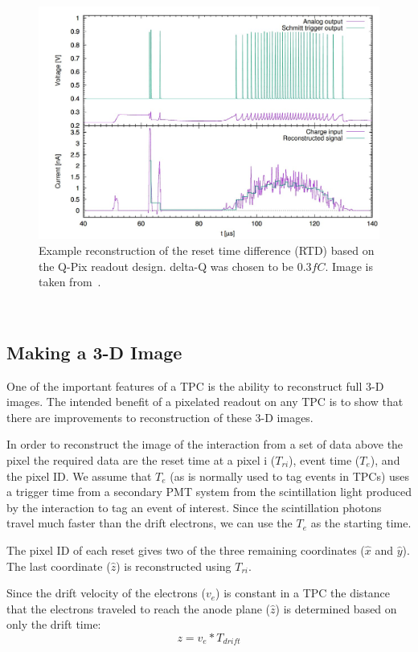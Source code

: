 \begin{figure}[]
\centering
\includegraphics[width=\textwidth]{images/qpix_rtd_reconstruction_example_03fc.jpg}
\caption{Example reconstruction of the reset time difference (RTD) based on the Q-Pix readout design. delta-Q was chosen to be $0.3 fC$. Image is taken from~\citep{qpix:nygren:mei}.}
\end{figure}
~\label{fig:qpixRecon2}

\subsection{Making a 3-D Image}

One of the important features of a TPC is the ability to reconstruct full 3-D images.
The intended benefit of a pixelated readout on any TPC is to show that there are improvements to reconstruction of these 3-D images.

In order to reconstruct the image of the interaction from a set of data above the pixel the required data are the reset time at a pixel i ($T_{ri}$), event time ($T_{e}$), and the pixel ID.
We assume that $T_{e}$ (as is normally used to tag events in TPCs) uses a trigger time from a secondary PMT system from the scintillation light produced by the interaction to tag an event of interest.
Since the scintillation photons travel much faster than the drift electrons, we can use the $T_{e}$ as the starting time.

The pixel ID of each reset gives two of the three remaining coordinates ($\hat{x}$ and $\hat{y}$).
The last coordinate ($\hat{z}$) is reconstructed using $T_{ri}$.

Since the drift velocity of the electrons ($v_{e}$) is constant in a TPC the distance that the electrons traveled to reach the anode plane ($\hat{z}$) is determined based on only the drift time:
\begin{equation}
  z = v_{e} * T_{drift}
\end{equation}~\label{eq:driftDistance}

